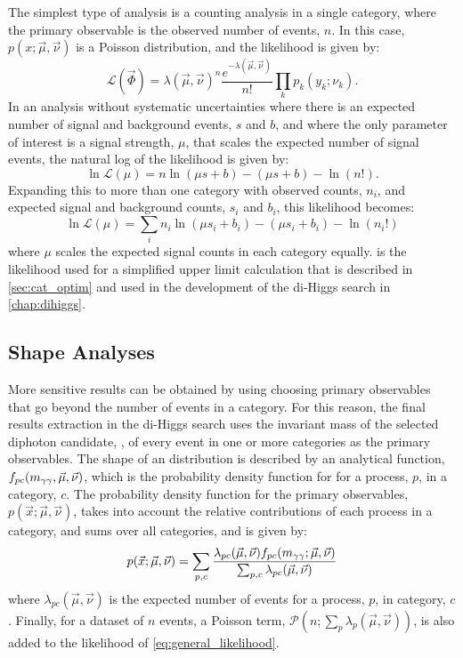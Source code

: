 The simplest type of analysis is a counting analysis in a single category, where the primary observable is the observed number of events, $n$. In this case, $p(x;\vec{\mu},\vec{\nu})$ is a Poisson distribution, and the likelihood is given by:
\begin{equation}
  \mathcal{L}(\vec{\Phi}) = \lambda(\vec{\mu},\vec{\nu})^n \frac{e^{-\lambda(\vec{\mu},\vec{\nu})}}{n!} \prod_k p_k(y_k;\nu_k).
\end{equation}
In an analysis without systematic uncertainties where there is an expected number of signal and background events, $s$ and $b$, and where the only parameter of interest is a signal strength, $\mu$, that scales the expected number of signal events, the natural log of the likelihood is given by:
\begin{equation}
  \ln\mathcal{L}(\mu) = n \ln(\mu s + b) - (\mu s + b) - \ln(n!).
\end{equation} 
Expanding this to more than one category with observed counts, $n_i$, and expected signal and background counts, $s_i$ and $b_i$, this likelihood becomes:
\begin{equation}
  \ln\mathcal{L}(\mu) = \sum_i n_i \ln(\mu s_i + b_i) - (\mu s_i + b_i) - \ln(n_i!)
  \label{eq:counting_likelihood}
\end{equation}
where $\mu$ scales the expected signal counts in each category equally.  is the likelihood used for a simplified upper limit calculation that is described in \cref{sec:cat_optim} and used in the development of the di-Higgs search in \cref{chap:dihiggs}.

\subsection{Shape Analyses}\label{sec:stats_shape_analysis}
More sensitive results can be obtained by using choosing primary observables that go beyond the number of events in a category. For this reason, the final results extraction in the di-Higgs search uses the invariant mass of the selected diphoton candidate, \mgg, of every event in one or more categories as the primary observables. The shape of an \mgg distribution is described by an analytical function, $f_{pc}(m_{\gamma\gamma},\vec{\mu},\vec{\nu})$, which is the probability density function for \mgg for a process, $p$, in a category, $c$. The probability density function for the primary observables, $p(\vec{x};\vec{\mu},\vec{\nu})$, takes into account the relative contributions of each process in a category, and sums over all categories, and is given by:
\begin{equation}
  p(\vec{x};\vec{\mu},\vec{\nu}) = \sum_{p,c} \frac{\lambda_{pc}(\vec{\mu}, \vec{\nu}) f_{pc}(m_{\gamma\gamma};\vec{\mu},\vec{\nu})}{\sum_{p,c} \lambda_{pc}(\vec{\mu},\vec{\nu})}
  \label{eq:parametric_p_x}
\end{equation}
where $\lambda_{pc}(\vec{\mu},\vec{\nu})$ is the expected number of events for a process, $p$, in category, $c$. Finally, for a dataset of $n$ events, a Poisson term, $\mathcal{P}(n;\sum_p \lambda_p(\vec{\mu},\vec{\nu}))$, is also added to the likelihood of \cref{eq:general_likelihood}.  

